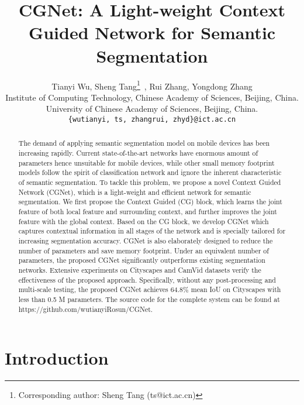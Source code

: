 \documentclass[10pt,twocolumn,letterpaper]{article}
\begin{document}
\title{CGNet: A Light-weight Context Guided Network for Semantic Segmentation}

\author{Tianyi Wu, Sheng Tang\thanks{Corresponding author: Sheng Tang (ts@ict.ac.cn)}\, , Rui Zhang, Yongdong Zhang\\
Institute of Computing Technology, Chinese Academy of Sciences, Beijing, China. \\
 University of Chinese Academy of Sciences, Beijing, China. \\
{\tt\small {\{wutianyi, ts, zhangrui, zhyd\}}@ict.ac.cn}
}

\maketitle







\begin{abstract}
The demand of applying semantic segmentation model on mobile devices has been increasing rapidly. Current state-of-the-art networks have enormous amount of parameters hence unsuitable for mobile devices, while other small memory footprint models follow the spirit of classification network and ignore the inherent characteristic of semantic segmentation. To tackle this problem, we propose a novel Context Guided Network (CGNet), which is a light-weight and efficient network for semantic segmentation. We first propose the Context Guided (CG) block, which learns the joint feature of both local feature and surrounding context, and further improves the joint feature with the global context. Based on the CG block, we develop CGNet which captures contextual information in all stages of the network and is specially tailored for increasing segmentation accuracy. CGNet is also elaborately designed to reduce the number of parameters and save memory footprint. Under an equivalent number of parameters, the proposed CGNet significantly outperforms existing segmentation networks. Extensive experiments on Cityscapes and CamVid datasets verify the effectiveness of the proposed approach. Specifically, without any post-processing and multi-scale testing, the proposed CGNet achieves 64.8\% mean IoU on Cityscapes with less than 0.5 M parameters. The source code for the complete system can be found at \textcolor[rgb]{1,0,0}{https://github.com/wutianyiRosun/CGNet}.
\end{abstract}


\section{Introduction}
\end{document}

